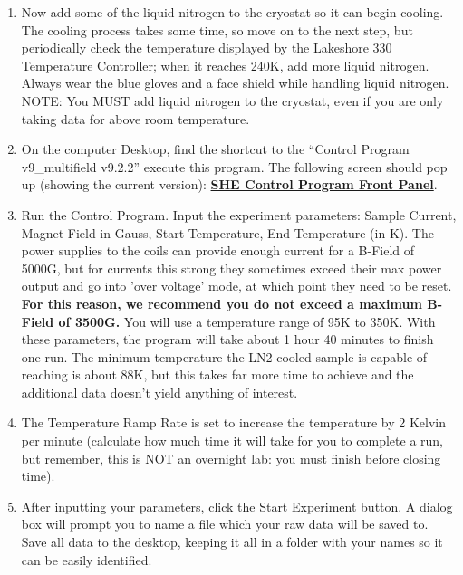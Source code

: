 \documentclass{../lab}
\begin{document}
\begin{enumerate}
    \item Now add some of the liquid nitrogen to the cryostat so it can begin cooling. The cooling process takes some time, so move on to the next step, but periodically check the temperature displayed by the Lakeshore 330 Temperature Controller; when it reaches 240K, add more liquid nitrogen. Always wear the blue gloves and a face shield while handling liquid nitrogen. NOTE: You MUST add liquid nitrogen to the cryostat, even if you are only taking data for above room temperature.

    \item On the computer Desktop, find the shortcut to the ``Control Program v9\_multifield v9.2.2'' execute this program. The following screen should pop up (showing the current version): \href{https://berkeley-physics111b.github.io/assets/pdf/oldwebsitestructure/images/SHE\_FrontPanel.pdf}{\textbf{SHE Control Program Front Panel}}.

    \item Run the Control Program. Input the experiment parameters: Sample Current, Magnet Field in Gauss, Start Temperature, End Temperature (in K). The power supplies to the coils can provide enough current for a B-Field of 5000G, but for currents this strong they sometimes exceed their max power output and go into 'over voltage' mode, at which point they need to be reset. \textbf{For this reason, we recommend you do not exceed a maximum B-Field of 3500G.} You will use a temperature range of 95K to 350K. With these parameters, the program will take about 1 hour 40 minutes to finish one run. The minimum temperature the LN2-cooled sample is capable of reaching is about 88K, but this takes far more time to achieve and the additional data doesn't yield anything of interest.%

    \item The Temperature Ramp Rate is set to increase the temperature by 2 Kelvin per minute (calculate how much time it will take for you to complete a run, but remember, this is NOT an overnight lab: you must finish before closing time).  

    \item After inputting your parameters, click the Start Experiment button. A dialog box will prompt you to name a file which your raw data will be saved to. Save all data to the desktop, keeping it all in a folder with your names so it can be easily identified.


\end{enumerate}
\end{document}
